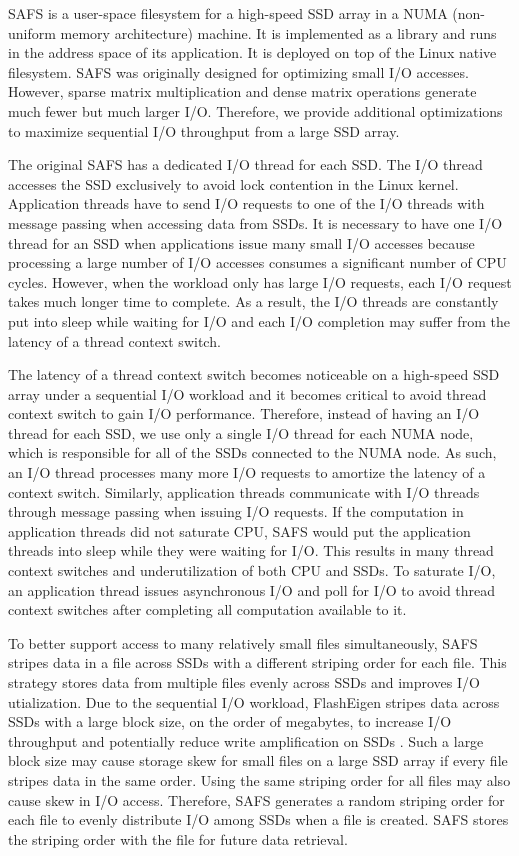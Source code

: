 SAFS \cite{safs} is a user-space filesystem for a high-speed SSD array in
a NUMA (non-uniform memory architecture) machine. It is implemented as
a library and runs in the address space
of its application. It is deployed on top of the Linux native filesystem.
SAFS was originally designed for optimizing small I/O accesses. However,
sparse matrix multiplication and dense matrix operations
generate much fewer but much larger I/O. Therefore, we provide additional
optimizations to maximize sequential I/O throughput from a large SSD array.

The original SAFS has a dedicated I/O thread for each SSD. The I/O thread
accesses the SSD exclusively to avoid lock contention in the Linux kernel.
Application threads have to send I/O requests to one of the I/O threads
with message passing when accessing data from SSDs. It is necessary to have
one I/O thread for
an SSD when applications issue many small I/O accesses because processing
a large number of I/O accesses consumes a significant number of CPU cycles.
However, when the workload only has large I/O requests, each I/O request takes
much longer time to complete. As a result, the I/O threads are constantly put
into sleep while waiting for I/O and each I/O completion may suffer from
the latency of a thread context switch.

The latency of a thread context switch becomes noticeable on a high-speed SSD
array under a sequential I/O workload and it becomes critical to avoid thread
context switch to gain I/O performance. Therefore, instead of having an I/O
thread for each SSD, we use only a single I/O thread for each NUMA node, which
is responsible for all of the SSDs connected to the NUMA node. As such, an I/O
thread processes many more I/O requests to amortize the latency of a context
switch. Similarly, application threads communicate with I/O threads through
message passing when issuing I/O requests. If the computation in application
threads did not saturate CPU, SAFS would put the application threads into
sleep while they were waiting for I/O. This results in many thread context
switches and underutilization of both CPU and SSDs. To saturate I/O,
an application thread issues asynchronous I/O and poll for I/O to avoid thread
context switches after completing all computation available to it.

To better support access to many relatively small files simultaneously, SAFS
stripes data in a file across SSDs with a different striping order for each file.
This strategy stores data from multiple files evenly across SSDs and improves
I/O utialization. Due to the sequential I/O workload, FlashEigen stripes data
across SSDs with a large block size, on the order of megabytes, to increase I/O
throughput and potentially reduce write amplification on SSDs \cite{Tang15}.
Such a large block size may cause storage skew for small files
on a large SSD array if every file stripes data in the same order. Using
the same striping order for all files may also cause skew in I/O access.
Therefore, SAFS generates a random striping order for each file to evenly
distribute I/O among SSDs when a file is created. SAFS stores the striping
order with the file for future data retrieval.

